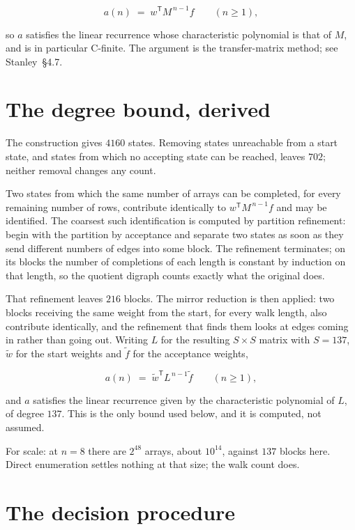 \documentclass[11pt]{article}
\theoremstyle{definition}
\begin{document}
\[a(n) \;=\; w^{\mathsf T} M^{\,n-1} f \qquad (n \ge 1),\]

so $a$ satisfies the linear recurrence whose characteristic polynomial is that of $M$, and is in particular C-finite. The argument is the transfer-matrix method; see Stanley~\S4.7.

\section{The degree bound, derived}

The construction gives $4160$ states. Removing states unreachable from a start state, and states from which no accepting state can be reached, leaves $702$; neither removal changes any count.

Two states from which the same number of arrays can be completed, for every remaining number of rows, contribute identically to $w^{\mathsf T}M^{\,n-1}f$ and may be identified. The coarsest such identification is computed by partition refinement: begin with the partition by acceptance and separate two states as soon as they send different numbers of edges into some block. The refinement terminates; on its blocks the number of completions of each length is constant by induction on that length, so the quotient digraph counts exactly what the original does.

That refinement leaves $216$ blocks. The mirror reduction is then applied: two blocks receiving the same weight from the start, for every walk length, also contribute identically, and the refinement that finds them looks at edges coming in rather than going out. Writing $L$ for the resulting $S \times S$ matrix with $S = 137$, $\tilde w$ for the start weights and $\tilde f$ for the acceptance weights,

\[a(n) \;=\; \tilde w^{\mathsf T} L^{\,n-1} \tilde f \qquad (n \ge 1),\]

and $a$ satisfies the linear recurrence given by the characteristic polynomial of $L$, of degree $137$. This is the only bound used below, and it is computed, not assumed.

For scale: at $n = 8$ there are $2^{48}$ arrays, about $10^{14}$, against $137$ blocks here. Direct enumeration settles nothing at that size; the walk count does.

\section{The decision procedure}
\end{document}
